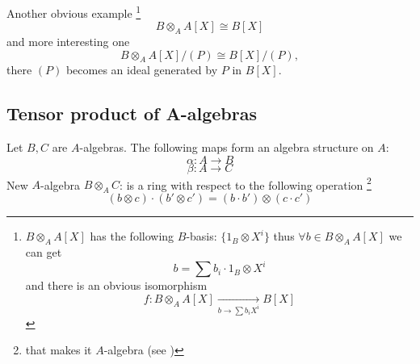 \begin{example}
  Another obvious example
  \footnote {
    $B \otimes_A A\left[X\right]$ has the following $B$-basis:
    $\{1_B \otimes X^i\}$ thus
    $\forall b \in B \otimes_A A\left[X\right]$ we can get
    \[
    b = \sum b_i \cdot 1_B \otimes X^i
    \]
    and there is an obvious isomorphism
    \[
    f: B \otimes_A A\left[X\right]
    \xrightarrow[b \to \sum b_i X^i]{}
    B\left[X\right]
    \]
  }
  \[
  B \otimes_A A\left[X\right] \cong B\left[X\right]
  \]
  and more interesting one
  \[
  B \otimes_A A\left[X\right]/(P) \cong B\left[X\right]/(P),
  \]
  there $(P)$ becomes an ideal generated by $P$ in
  $B\left[X\right]$.
  \label{ex:lec4_1}
\end{example}

\subsection{Tensor product of A-algebras}

Let $B, C$ are $A$-algebras. The following maps form an algebra
structure on $A$:
\[
\alpha: A \to B
\]
\[
\beta: A \to C
\]
New $A$-algebra $B \otimes_A C$: is a ring with respect to the
following operation
\footnote{
  that makes it $A$-algebra (see )
}
\begin{equation}
\left(b \otimes c \right) \cdot \left(b' \otimes c'\right) =
\left(b \cdot b'\right) \otimes \left(c \cdot c'\right)
\label{eq:lec4_algebra_tensor_product}
\end{equation}


